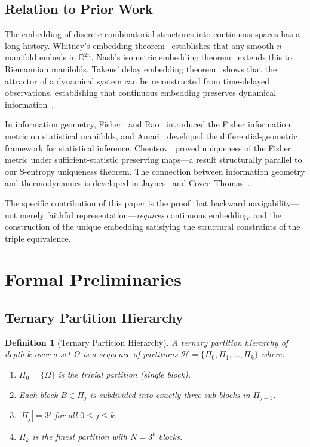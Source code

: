\documentclass[12pt,twocolumn]{article}
\newtheorem{definition}{Definition}[section]
\begin{document}
\subsection{Relation to Prior Work}

The embedding of discrete combinatorial structures into continuous spaces has a long history. Whitney's embedding theorem~\cite{whitney1936differentiable} establishes that any smooth $n$-manifold embeds in $\mathbb{R}^{2n}$. Nash's isometric embedding theorem~\cite{nash1956imbedding} extends this to Riemannian manifolds. Takens' delay embedding theorem~\cite{takens1981detecting} shows that the attractor of a dynamical system can be reconstructed from time-delayed observations, establishing that continuous embedding preserves dynamical information~\cite{sauer1991embedology}.

In information geometry, Fisher~\cite{fisher1922mathematical} and Rao~\cite{rao1945information} introduced the Fisher information metric on statistical manifolds, and Amari~\cite{amari1985differential} developed the differential-geometric framework for statistical inference. Chentsov~\cite{chentsov1972statistical} proved uniqueness of the Fisher metric under sufficient-statistic preserving maps---a result structurally parallel to our S-entropy uniqueness theorem. The connection between information geometry and thermodynamics is developed in Jaynes~\cite{jaynes1957information} and Cover--Thomas~\cite{cover2006elements}.

The specific contribution of this paper is the proof that backward navigability---not merely faithful representation---\emph{requires} continuous embedding, and the construction of the unique embedding satisfying the structural constraints of the triple equivalence.


\section{Formal Preliminaries}
\label{sec:preliminaries}

\subsection{Ternary Partition Hierarchy}

\begin{definition}[Ternary Partition Hierarchy]
\label{def:ternary_hierarchy}
A \emph{ternary partition hierarchy} of depth $k$ over a set $\Omega$ is a sequence of partitions $\mathcal{H} = \{\Pi_0, \Pi_1, \ldots, \Pi_k\}$ where:
\begin{enumerate}
\item $\Pi_0 = \{\Omega\}$ is the trivial partition (single block).
\item Each block $B \in \Pi_j$ is subdivided into exactly three sub-blocks in $\Pi_{j+1}$.
\item $|\Pi_j| = 3^j$ for all $0 \leq j \leq k$.
\item $\Pi_k$ is the finest partition with $N = 3^k$ blocks.
\end{enumerate}
\end{definition}
\end{document}
